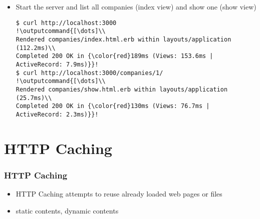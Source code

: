 \documentclass{beamer}
\newcommand{\outputcommand}[1]{\color{darkgreen}{#1}}
\begin{document}
\begin{frame}
\begin{itemize}
\begin{lstlisting}[escapechar=&]
64.times do
  company = Company.new(name: Faker::Company.name)
  if company.save ETag support 
    SecureRandom.random_number(128).times do
      company.employees.create(first_name: Faker::Name.first_name,
                               last_name: Faker::Name.last_name,
                               phone_number: Faker::PhoneNumber.phone_number)
    end
  end
end
\end{lstlisting}

\lstset{language=shell}
\begin{lstlisting}[escapechar=!]
$ rake db:seed
!\outputcommand{[\dots]}!
\end{lstlisting}

\item Start the server and list all companies (index view) and show one (show view)
\lstset{language=shell}
\begin{lstlisting}[escapechar=!]
$ curl http://localhost:3000
!\outputcommand{[\dots]\\
Rendered companies/index.html.erb within layouts/application (112.2ms)\\
Completed 200 OK in {\color{red}189ms (Views: 153.6ms | ActiveRecord: 7.9ms)}}!
$ curl http://localhost:3000/companies/1/
!\outputcommand{[\dots]\\
Rendered companies/show.html.erb within layouts/application (25.7ms)\\
Completed 200 OK in {\color{red}130ms (Views: 76.7ms | ActiveRecord: 2.3ms)}}!
\end{lstlisting}
\end{itemize}
\end{frame}
\section{HTTP Caching}
\begin{frame}[fragile]
\frametitle{HTTP Caching}
\begin{itemize}
\item HTTP Caching attempts to reuse already loaded web pages or files
\item static contents, dynamic contents
\end{itemize}
\end{frame}
\end{document}
